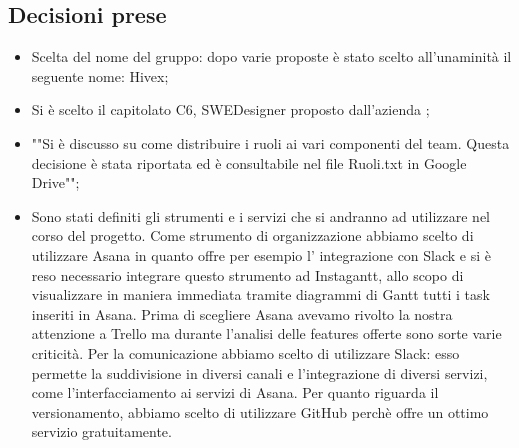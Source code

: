 \subsection{Decisioni prese} 
\begin{itemize}
\item Scelta del nome del gruppo: dopo varie proposte è stato scelto all’unaminità il seguente nome: Hivex; 
\item Si è scelto il capitolato C6, SWEDesigner proposto dall’azienda \ZU; 
\item ""Si è discusso su come distribuire i ruoli ai vari componenti del team. Questa decisione è stata riportata ed è consultabile nel file Ruoli.txt in Google Drive"";
\item Sono stati definiti gli strumenti e i servizi che si andranno ad utilizzare nel corso del progetto. Come strumento di organizzazione abbiamo scelto di utilizzare Asana in quanto offre per esempio l' integrazione con Slack e si è reso necessario integrare questo strumento ad Instagantt, allo scopo di visualizzare in maniera immediata tramite diagrammi di Gantt tutti i task inseriti in Asana. Prima di scegliere Asana avevamo rivolto la nostra attenzione a Trello ma durante l'analisi delle features offerte sono sorte varie criticità. Per la comunicazione abbiamo scelto di utilizzare Slack: esso permette la suddivisione in diversi canali e l'integrazione di diversi servizi, come l'interfacciamento ai servizi di Asana. Per quanto riguarda il versionamento, abbiamo scelto di utilizzare  GitHub perchè offre un ottimo servizio gratuitamente.

\end{itemize}


